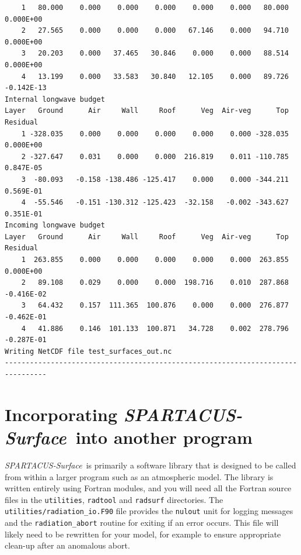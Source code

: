 \documentclass[a4,oneside]{article}
\def\codesize{\small}
\def\spsurf{\emph{SPARTACUS-Surface}}
\def\code#1{{\codesize\texttt{#1}}}
\begin{document}
\begin{verbatim}
    1   80.000    0.000    0.000    0.000    0.000    0.000   80.000  0.000E+00
    2   27.565    0.000    0.000    0.000   67.146    0.000   94.710  0.000E+00
    3   20.203    0.000   37.465   30.846    0.000    0.000   88.514  0.000E+00
    4   13.199    0.000   33.583   30.840   12.105    0.000   89.726 -0.142E-13
Internal longwave budget
Layer   Ground      Air     Wall     Roof      Veg  Air-veg      Top   Residual
    1 -328.035    0.000    0.000    0.000    0.000    0.000 -328.035  0.000E+00
    2 -327.647    0.031    0.000    0.000  216.819    0.011 -110.785  0.847E-05
    3  -80.093   -0.158 -138.486 -125.417    0.000    0.000 -344.211  0.569E-01
    4  -55.546   -0.151 -130.312 -125.423  -32.158   -0.002 -343.627  0.351E-01
Incoming longwave budget
Layer   Ground      Air     Wall     Roof      Veg  Air-veg      Top   Residual
    1  263.855    0.000    0.000    0.000    0.000    0.000  263.855  0.000E+00
    2   89.108    0.029    0.000    0.000  198.716    0.010  287.868 -0.416E-02
    3   64.432    0.157  111.365  100.876    0.000    0.000  276.877 -0.462E-01
    4   41.886    0.146  101.133  100.871   34.728    0.002  278.796 -0.287E-01
Writing NetCDF file test_surfaces_out.nc
--------------------------------------------------------------------------------

\end{verbatim}
\normalsize

\section{Incorporating \spsurf\ into another program}
\label{sec:api}

\spsurf\ is primarily a software library that is designed to be called
from within a larger program such as an atmospheric model.  The
library is written entirely using Fortran modules, and you will need
all the Fortran source files in the \code{utilities}, \code{radtool}
and \code{radsurf} directories.  The
\code{utilities/radiation\_io.F90} file provides the \code{nulout}
unit for logging messages and the \code{radiation\_abort} routine for
exiting if an error occurs.  This file will likely need to be
rewritten for your model, for example to ensure appropriate clean-up
after an anomalous abort.

\end{document}
